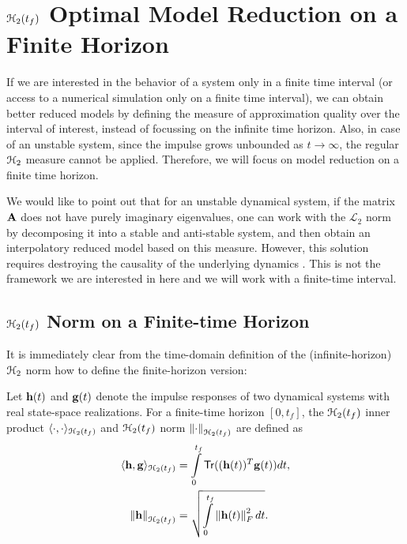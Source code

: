 \documentclass[twocolumn]{autart}
\begin{document}
\section{$\EuScript{H}_2(t_f)$ Optimal Model Reduction on a Finite Horizon}  \label{sec:main} 
If we are interested  in the behavior of a system only in a finite time interval (or access to a numerical simulation only on a finite time interval), we can obtain better reduced models by defining the measure of approximation quality over the interval of interest, instead of  focussing on the infinite time horizon. Also, in case of an unstable system, since the impulse grows unbounded as $t \to \infty$, the regular $\EuScript{H}_2$ measure cannot be applied. Therefore, we will focus on model reduction on a finite time horizon. 

We would like to point out that for an unstable dynamical system, if the matrix $\mathbf{A}$ does not have purely imaginary eigenvalues, one can work with the
 $\mathcal{L}_2$ norm by decomposing it into a stable and anti-stable system, and then obtain an interpolatory reduced model based on this measure.  However, this solution requires destroying the causality of the underlying dynamics \cite{magruder2010rational}. This is not the framework we are interested in here and we will work with a finite-time interval. 
 
  
\subsection{$\EuScript{H}_2(t_f)$ Norm on a Finite-time Horizon}
It is immediately clear from the time-domain definition of the (infinite-horizon) $\EuScript{H}_2$ norm how to define the finite-horizon version:
\begin{Definition}\label{innerh2}
Let $\mathbf{h}(t)$ and $\mathbf{g}(t)$ denote the impulse responses of two dynamical systems with real state-space realizations.  
For a finite-time horizon 
$[0,t_f]$, the $\EuScript{H}_2(t_f)$ inner product $\langle \cdot, \cdot \rangle_{\EuScript{H}_2(t_f)}$ 
and $\EuScript{H}_2(t_f)$ norm $\left\lVert\cdot\right\rVert_{\EuScript{H}_2(t_f)}$ are defined as  
\begin{align*}
\langle \h, \g \rangle_{\ch_2(\tf)} &=\int_0^{\tf} \mathsf{Tr}( (\h(t))^T \g(t)) dt, \\%
\norm{\h}_{\ch_2(\tf)} &=\sqrt{\int_0^{\tf} \norm{\h(t)}_F^2 dt}.
\end{align*}

\end{Definition}
\end{document}
